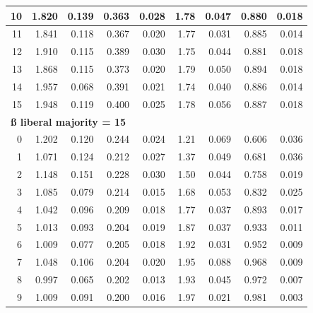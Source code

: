 \documentclass[
]{article}
\begin{document}
\begin{table}
\begin{tabular}[t]{r|r|r|r|r|r|r|r|r}
\hspace{1em}10 & 1.820 & 0.139 & 0.363 & 0.028 & 1.78 & 0.047 & 0.880 & 0.018\\
\hline
\hspace{1em}11 & 1.841 & 0.118 & 0.367 & 0.020 & 1.77 & 0.031 & 0.885 & 0.014\\
\hline
\hspace{1em}12 & 1.910 & 0.115 & 0.389 & 0.030 & 1.75 & 0.044 & 0.881 & 0.018\\
\hline
\hspace{1em}13 & 1.868 & 0.115 & 0.373 & 0.020 & 1.79 & 0.050 & 0.894 & 0.018\\
\hline
\hspace{1em}14 & 1.957 & 0.068 & 0.391 & 0.021 & 1.74 & 0.040 & 0.886 & 0.014\\
\hline
\hspace{1em}15 & 1.948 & 0.119 & 0.400 & 0.025 & 1.78 & 0.056 & 0.887 & 0.018\\
\hline
\multicolumn{9}{l}{\textbf{ß liberal majority = 15}}\\
\hline
\hspace{1em}0 & 1.202 & 0.120 & 0.244 & 0.024 & 1.21 & 0.069 & 0.606 & 0.036\\
\hline
\hspace{1em}1 & 1.071 & 0.124 & 0.212 & 0.027 & 1.37 & 0.049 & 0.681 & 0.036\\
\hline
\hspace{1em}2 & 1.148 & 0.151 & 0.228 & 0.030 & 1.50 & 0.044 & 0.758 & 0.019\\
\hline
\hspace{1em}3 & 1.085 & 0.079 & 0.214 & 0.015 & 1.68 & 0.053 & 0.832 & 0.025\\
\hline
\hspace{1em}4 & 1.042 & 0.096 & 0.209 & 0.018 & 1.77 & 0.037 & 0.893 & 0.017\\
\hline
\hspace{1em}5 & 1.013 & 0.093 & 0.204 & 0.019 & 1.87 & 0.037 & 0.933 & 0.011\\
\hline
\hspace{1em}6 & 1.009 & 0.077 & 0.205 & 0.018 & 1.92 & 0.031 & 0.952 & 0.009\\
\hline
\hspace{1em}7 & 1.048 & 0.106 & 0.204 & 0.020 & 1.95 & 0.088 & 0.968 & 0.009\\
\hline
\hspace{1em}8 & 0.997 & 0.065 & 0.202 & 0.013 & 1.93 & 0.045 & 0.972 & 0.007\\
\hline
\hspace{1em}9 & 1.009 & 0.091 & 0.200 & 0.016 & 1.97 & 0.021 & 0.981 & 0.003\\

\end{tabular}
\end{table}
\end{document}
